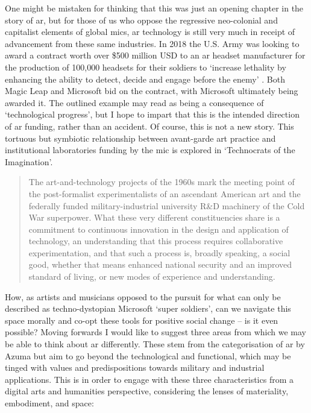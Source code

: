 One might be mistaken for thinking that this was just an opening chapter in the story of \gls{ar}, but for those of us who oppose the regressive neo-colonial and capitalist elements of global \glspl{mic}, \gls{ar} technology is still very much in receipt of advancement from these same industries. In 2018 the U.S. Army was looking to award a contract worth over \$500 million USD to an \gls{ar} headset manufacturer for the production of 100,000 headsets for their soldiers to `increase lethality by enhancing the ability to detect, decide and engage before the enemy' \citep{brustein2018}. Both Magic Leap and Microsoft bid on the contract, with Microsoft ultimately being awarded it. The outlined example may read as being a consequence of `technological progress', but I hope to impart that this is the intended direction of \gls{ar} funding, rather than an accident. Of course, this is not a new story. This tortuous but symbiotic relationship between avant-garde art practice and institutional laboratories funding by the \gls{mic} is explored in `Technocrats of the Imagination'.
\begin{quote}
    The art-and-technology projects of the 1960s mark the meeting point of the post-formalist experimentalists of an ascendant American art and the federally funded military-industrial university R\&D machinery of the Cold War superpower. What these very different constituencies share is a commitment to continuous innovation in the design and application of technology, an understanding that this process requires collaborative experimentation, and that such a process is, broadly speaking, a social good, whether that means enhanced national security and an improved standard of living, or new modes of experience and understanding. \citep{beck2020}
\end{quote}

How, as artists and musicians opposed to the pursuit for what can only be described as techno-dystopian Microsoft `super soldiers', can we navigate this space morally and co-opt these tools for positive social change -- is it even possible? Moving forwards I would like to suggest three areas from which we may be able to think about \gls{ar} differently. These stem from the categorisation of \gls{ar} by Azuma  
\citeyearpar{azuma1997} but aim to go beyond the technological and functional, which may be tinged with values and predispositions towards military and industrial applications. This is in order to engage with these three characteristics from a digital arts and humanities perspective, considering the lenses of materiality, embodiment, and space:

